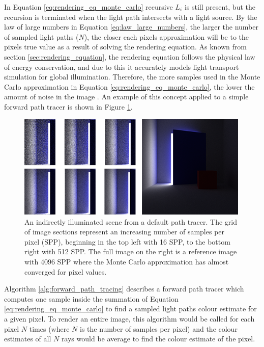 \documentclass[ %
                    author={Callum Pearce},
                supervisor={Dr. Neill Campbell},
                    degree={MEng},
                     title={How effective are Temporal difference learning methods for reducing the number of zero contribution light paths, while still accurately approximating Global Illumination in Path tracing?},
                  subtitle={},
                      type={research},
                      year={2019} ]{dissertation}
\begin{document}
In Equation \ref{eq:rendering_eq_monte_carlo} recursive $L_i$ is still present, but the recursion is terminated when the light path intersects with a light source. By the law of large numbers in Equation \ref{eq:law_large_numbers}, the larger the number of sampled light paths ($N$), the closer each pixels approximation will be to the pixels true value as a result of solving the rendering equation. As known from section \ref{sec:rendering_equation}, the rendering equation follows the physical law of energy conservation, and due to this it accurately models light transport simulation for global illumination. Therefore, the more samples used in the Monte Carlo approximation in Equation \ref{eq:rendering_eq_monte_carlo}, the lower the amount of noise in the image \cite{christensen2016path}. An example of this concept applied to a simple forward path tracer is shown in Figure \ref{fig:reduce_noise_spp_example}.

\begin{figure}[h]
\begin{center}
\includegraphics[width=0.99\textwidth]{images/renders/noise_reduction_default/increasing_samples.png}    
\end{center}
\caption{An indirectly illuminated scene from a default path tracer. The grid of image sections represent an increasing number of samples per pixel (SPP), beginning in the top left with 16 SPP, to the bottom right with 512 SPP. The full image on the right is a reference image with 4096 SPP where the Monte Carlo approximation has almost converged for pixel values.}
\label{fig:reduce_noise_spp_example}
\end{figure}

Algorithm \ref{alg:forward_path_tracing} describes a forward path tracer which computes one sample inside the summation of Equation \ref{eq:rendering_eq_monte_carlo} to find a sampled light paths colour estimate for a given pixel. To render an entire image, this algorithm would be called for each pixel $N$ times (where $N$ is the number of samples per pixel) and the colour estimates of all $N$ rays would be average to find the colour estimate of the pixel.\\
\end{document}
